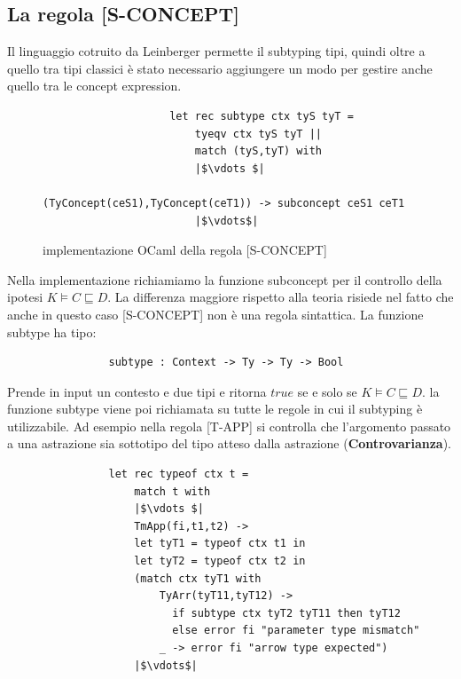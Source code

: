             \subsection{La regola [S-CONCEPT]}
            Il linguaggio cotruito da Leinberger permette il subtyping tipi, quindi oltre a quello tra tipi classici è stato necessario aggiungere un modo per gestire
            anche quello tra le concept expression.
            \begin{figure}[h]
                \begin{verbatim}
                    let rec subtype ctx tyS tyT =
                        tyeqv ctx tyS tyT ||
                        match (tyS,tyT) with
                        |$\vdots $|
                            (TyConcept(ceS1),TyConcept(ceT1)) -> subconcept ceS1 ceT1
                        |$\vdots$|
                \end{verbatim}
            \caption{implementazione OCaml della regola [S-CONCEPT]}
            \end{figure}
            Nella implementazione richiamiamo la funzione subconcept per il controllo della ipotesi $K \vDash C \sqsubseteq D$. La differenza maggiore rispetto alla teoria
            risiede nel fatto che anche in questo caso [S-CONCEPT] non è una regola sintattica. La funzione subtype ha tipo:
            \begin{verbatim}
                subtype : Context -> Ty -> Ty -> Bool
            \end{verbatim}
            Prende in input un contesto e due tipi e ritorna $true$ se e solo se $K \vDash C \sqsubseteq D$. la funzione subtype viene poi richiamata su tutte le regole
            in cui il subtyping è utilizzabile. Ad esempio nella regola [T-APP] si controlla che l'argomento passato a una astrazione sia sottotipo del tipo atteso dalla astrazione (\textbf{Controvarianza}).
            \begin{verbatim}
                let rec typeof ctx t =
                    match t with
                    |$\vdots $|
                    TmApp(fi,t1,t2) ->
                    let tyT1 = typeof ctx t1 in
                    let tyT2 = typeof ctx t2 in
                    (match ctx tyT1 with
                        TyArr(tyT11,tyT12) ->
                          if subtype ctx tyT2 tyT11 then tyT12
                          else error fi "parameter type mismatch"
                        _ -> error fi "arrow type expected")
                    |$\vdots$|
            \end{verbatim}












        
        
